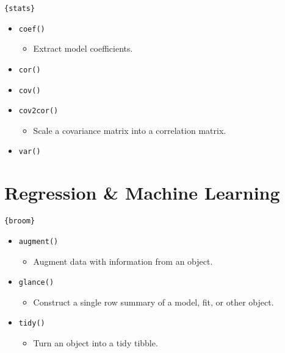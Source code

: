 \documentclass[
]{book}
\providecommand{\tightlist}{%
  \setlength{\itemsep}{0pt}\setlength{\parskip}{0pt}}
\begin{document}
\texttt{\{stats\}}

\begin{itemize}
\tightlist
\item
  \texttt{coef()}

  \begin{itemize}
  \tightlist
  \item
    Extract model coefficients.
  \end{itemize}
\item
  \texttt{cor()}
\item
  \texttt{cov()}
\item
  \texttt{cov2cor()}

  \begin{itemize}
  \tightlist
  \item
    Scale a covariance matrix into a correlation matrix.
  \end{itemize}
\item
  \texttt{var()}
\end{itemize}

\hypertarget{regression-machine-learning}{%
\section{Regression \& Machine Learning}\label{regression-machine-learning}}

\texttt{\{broom\}}

\begin{itemize}
\tightlist
\item
  \texttt{augment()}

  \begin{itemize}
  \tightlist
  \item
    Augment data with information from an object.
  \end{itemize}
\item
  \texttt{glance()}

  \begin{itemize}
  \tightlist
  \item
    Construct a single row summary of a model, fit, or other object.
  \end{itemize}
\item
  \texttt{tidy()}

  \begin{itemize}
  \tightlist
  \item
    Turn an object into a tidy tibble.
  \end{itemize}
\end{itemize}
\end{document}
